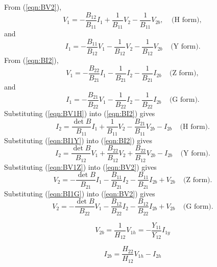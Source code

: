 \documentclass[a4paper, 12pt]{article}
\newcommand{\bigspace}{\;\;\;\;}
\newcommand{\refeqn}[1]{\mbox{(\ref{eqn:#1})}}
\begin{document}
From \refeqn{BV2},
%
\begin{equation}
  V_1 = -\frac{B_{12}}{B_{11}} I_1 + \frac{1}{B_{11}} V_2 - \frac{1}{B_{11}} V_{2b},
\bigspace \mbox{(H form)},
\label{eqn:BV1H}
\end{equation}
%
and
%
\begin{equation}
  I_1  =  -\frac{B_{11}}{B_{12}} V_1 - \frac{1}{B_{12}} V_2 - \frac{1}{B_{12}} V_{2b} \bigspace \mbox{(Y form)}.
\label{eqn:BI1Y}
\end{equation}
%
From \refeqn{BI2},
%
\begin{equation}
  V_1 = -\frac{B_{22}}{B_{21}} I_1 - \frac{1}{B_{21}} I_2  - \frac{1}{B_{21}} I_{2b} \bigspace \mbox{(Z form)},
\label{eqn:BV1Z}
\end{equation}
%
and
%
\begin{equation}
  I_1 = -\frac{B_{21}}{B_{22}} V_1 - \frac{1}{B_{22}} I_2 - \frac{1}{B_{22}} I_{2b}
\bigspace \mbox{(G form)}.
\label{eqn:BI1G}
\end{equation}
%
Substituting \refeqn{BV1H} into \refeqn{BI2} gives
%
\begin{equation}
  I_2 = \frac{\det{B}}{B_{11}} I_1 + \frac{1}{B_{11}} V_2 - \frac{B_{21}}{B_{11}} V_{2b} - I_{2b} \bigspace \mbox{(H form)}.
\label{eqn:BI2H}
\end{equation}
%
Substituting \refeqn{BI1Y} into \refeqn{BI2} gives
%
\begin{equation}
  I_2 = \frac{\det B}{B_{12}} V_1 + \frac{B_{22}}{B_{12}} V_2 + \frac{B_{22}}{B_{12}} V_{2b} - I_{2b} \bigspace \mbox{(Y form)}.
\label{eqn:BI2Y}
\end{equation}
%
Substituting \refeqn{BV1Z} into \refeqn{BV2} gives
%
\begin{equation}
  V_2 = -\frac{\det B}{B_{21}} I_1 - \frac{B_{11}}{B_{21}} I_2  - \frac{B_{11}}{B_{21}} I_{2b} + V_{2b}  \bigspace \mbox{(Z form)}.
\label{eqn:BV2Z}
\end{equation}
%
Substituting \refeqn{BI1G} into \refeqn{BV2} gives
%
\begin{equation}
  V_2 = -\frac{\det B}{B_{22}} V_1 - \frac{B_{12}}{B_{22}} I_2  - \frac{B_{12}}{B_{22}} I_{2b} + V_{2b}  \bigspace \mbox{(G form)}.
\label{eqn:BV2G}
\end{equation}

\begin{equation}
  V_{2b} = \frac{1}{H_{12}} V_{1h} = -\frac{Y_{11}}{Y_{12}} I_{1y}
\end{equation}

\begin{equation}
  I_{2b} = \frac{H_{22}}{H_{12}} V_{1h} - I_{2h}
\end{equation}
\end{document}
